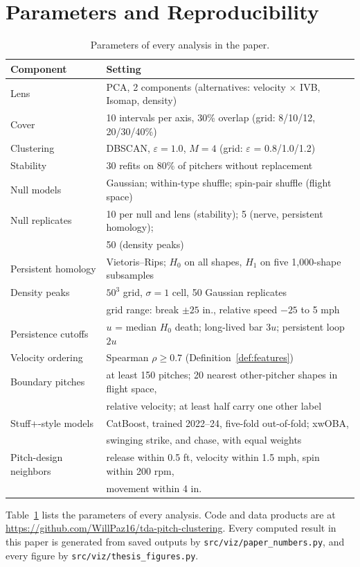 \documentclass[11pt]{article}
\theoremstyle{definition}
\theoremstyle{remark}
\begin{document}
\appendix
\section{Parameters and Reproducibility}\label{app:repro}
\begin{table}[htbp]
\centering
\begin{tabular}{ll}
\toprule
Component & Setting \\
\midrule
Lens & PCA, 2 components (alternatives: velocity $\times$ IVB, Isomap, density) \\
Cover & 10 intervals per axis, 30\% overlap (grid: 8/10/12, 20/30/40\%) \\
Clustering & DBSCAN, $\varepsilon = 1.0$, $M = 4$ (grid: $\varepsilon$ = 0.8/1.0/1.2) \\
Stability & 30 refits on 80\% of pitchers without replacement \\
Null models & Gaussian; within-type shuffle; spin-pair shuffle (flight space) \\
Null replicates & 10 per null and lens (stability); 5 (nerve, persistent homology); \\
 & 50 (density peaks) \\
Persistent homology & Vietoris--Rips; $H_0$ on all shapes, $H_1$ on five 1{,}000-shape subsamples \\
Density peaks & $50^3$ grid, $\sigma = 1$ cell, 50 Gaussian replicates \\
 & grid range: break $\pm 25$ in., relative speed $-25$ to 5 mph \\
Persistence cutoffs & $u$ = median $H_0$ death; long-lived bar $3u$; persistent loop $2u$ \\
Velocity ordering & Spearman $\rho \ge 0.7$ (Definition~\ref{def:features}) \\
Boundary pitches & at least 150 pitches; 20 nearest other-pitcher shapes in flight space, \\
 & relative velocity; at least half carry one other label \\
Stuff+-style models & CatBoost, trained 2022--24, five-fold out-of-fold; xwOBA, \\
 & swinging strike, and chase, with equal weights \\
Pitch-design neighbors & release within 0.5 ft, velocity within 1.5 mph, spin within 200 rpm, \\
 & movement within 4 in. \\
\bottomrule
\end{tabular}
\caption{Parameters of every analysis in the paper.}\label{tab:params}
\end{table}
Table~\ref{tab:params} lists the parameters of every analysis. Code and data products are at \url{https://github.com/WillPaz16/tda-pitch-clustering}. Every computed result in this paper is generated from saved outputs by \nolinkurl{src/viz/paper_numbers.py}, and every figure by \nolinkurl{src/viz/thesis_figures.py}.
\end{document}
